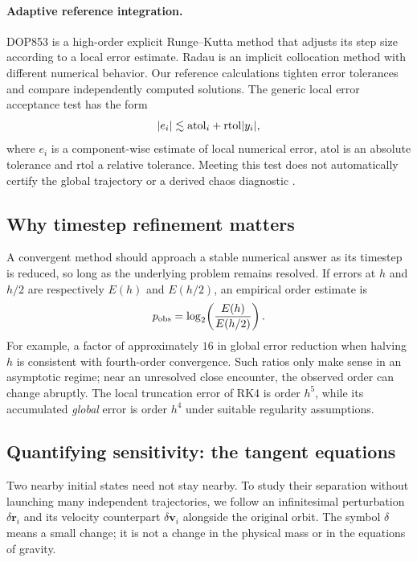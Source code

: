 \documentclass[10pt,letterpaper,twocolumn]{article}
\begin{document}
\paragraph{Adaptive reference integration.} DOP853 is a high-order explicit Runge--Kutta method that adjusts its step size according to a local error estimate. Radau is an implicit collocation method with different numerical behavior. Our reference calculations tighten error tolerances and compare independently computed solutions. The generic local error acceptance test has the form
\begin{equation}
 |e_i|\lesssim {\rm atol}_i+{\rm rtol}|y_i|,
\end{equation}
where $e_i$ is a component-wise estimate of local numerical error, $\mathrm{atol}$ is an absolute tolerance and $\mathrm{rtol}$ a relative tolerance. Meeting this test does not automatically certify the global trajectory or a derived chaos diagnostic \cite{virtanen2020scipy}.

\subsection{Why timestep refinement matters}
A convergent method should approach a stable numerical answer as its timestep is reduced, so long as the underlying problem remains resolved. If errors at $h$ and $h/2$ are respectively $E(h)$ and $E(h/2)$, an empirical order estimate is
\begin{equation}
 p_{\rm obs}=\log_2\!\left(\frac{E(h)}{E(h/2)}\right).
\end{equation}
For example, a factor of approximately $16$ in global error reduction when halving $h$ is consistent with fourth-order convergence. Such ratios only make sense in an asymptotic regime; near an unresolved close encounter, the observed order can change abruptly. The local truncation error of RK4 is order $h^5$, while its accumulated \emph{global} error is order $h^4$ under suitable regularity assumptions.

\subsection{Quantifying sensitivity: the tangent equations}
Two nearby initial states need not stay nearby. To study their separation without launching many independent trajectories, we follow an infinitesimal perturbation $\delta\boldsymbol r_i$ and its velocity counterpart $\delta\boldsymbol v_i$ alongside the original orbit. The symbol $\delta$ means a small change; it is not a change in the physical mass or in the equations of gravity.
\end{document}

